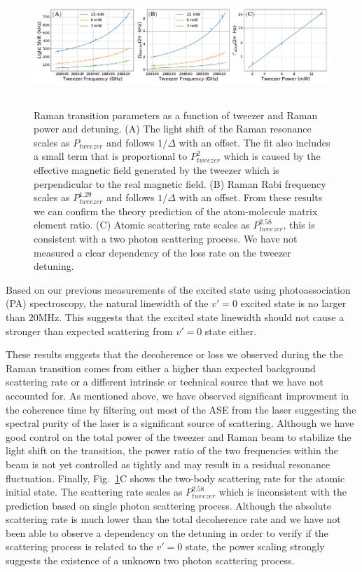 \documentclass[aps,prl,twocolumn,superscriptaddress]{revtex4-1}
\begin{document}
\begin{figure}
  \includegraphics[height=4.5cm]{fig4.pdf}
  \caption{Raman transition parameters as a function of tweezer and Raman power and detuning.
    (A) The light shift of the Raman resonance scales as $P_{tweezer}$
    and follows $1/\Delta$ with an offset.
    The fit also includes a small term that is proportional to $P_{tweezer}^2$
    which is caused by the effective magnetic field generated by the tweezer which is
    perpendicular to the real magnetic field.
    (B) Raman Rabi frequency scales as $P_{tweezer}^{1.29}$ and follows $1/\Delta$ with an offset.
    From these results we can confirm the theory prediction of
    the atom-molecule matrix element ratio.
    (C) Atomic scattering rate scales as $P_{tweezer}^{2.58}$,
    this is consistent with a two photon scattering process.
    We have not measured a clear dependency of the loss rate on the tweezer detuning.
    \label{f-det}}
\end{figure}

Based on our previous measurements of the excited state using photoassociation (PA) spectroscopy,
the natural linewidth of the $v'=0$ excited state is no larger than $20 \mathrm{MHz}$.
This suggests that the excited state linewidth should not cause a stronger than expected
scattering from $v'=0$ state either.

These results suggests that the decoherence or loss we observed during the the Raman transition
comes from either a higher than expected background scattering rate
or a different intrinsic or technical source that we have not accounted for.
As mentioned above, we have observed significant improvment in the coherence time
by filtering out most of the ASE from the laser suggesting the spectral purity of
the laser is a significant source of scattering.
Although we have good control on the total power of the tweezer and Raman beam to stabilize
the light shift on the transition, the power ratio of the two frequencies within the beam
is not yet controlled as tightly and may result in a residual resonance fluctuation.
Finally, Fig.~\ref{f-det}C shows the two-body scattering rate for the atomic initial state.
The scattering rate scales as $P_{tweezer}^{2.58}$ which is inconsistent with
the prediction based on single photon scattering process.
Although the absolute scattering rate is much lower than the total decoherence rate
and we have not been able to observe a dependency on the detuning in order to
verify if the scattering process is related to the $v'=0$ state, the power scaling
strongly suggests the existence of a unknown two photon scattering process.
\end{document}
